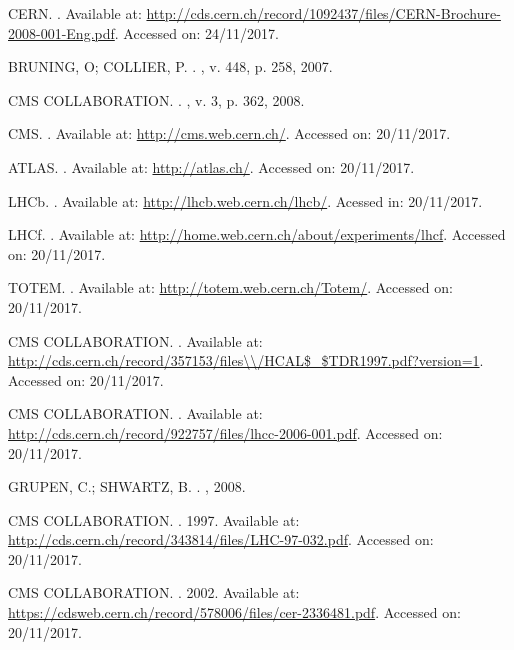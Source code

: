 \begin{thebibliography}{}
CERN. 
.
Available at: \url{http://cds.cern.ch/record/1092437/files/CERN-Brochure-2008-001-Eng.pdf}.
Accessed on: 24/11/2017.

BRUNING, O; COLLIER, P.
.
, v. 448, p. 258, 2007.

CMS COLLABORATION.
.
, v. 3, p. 362, 2008.

CMS.
.
Available at: \url{http://cms.web.cern.ch/}.
Accessed on: 20/11/2017.

ATLAS.
.
Available at: \url{http://atlas.ch/}.
Accessed on: 20/11/2017.

LHCb.
.
Available at: \url{http://lhcb.web.cern.ch/lhcb/}.
Acessed in: 20/11/2017.

LHCf.
.
Available at: \url{http://home.web.cern.ch/about/experiments/lhcf}.
Accessed on: 20/11/2017.

TOTEM.
.
Available at: \url{http://totem.web.cern.ch/Totem/}.
Accessed on: 20/11/2017.

CMS COLLABORATION.
.
Available at: \url{http://cds.cern.ch/record/357153/files\\/HCAL$\_$TDR1997.pdf?version=1}.
Accessed on: 20/11/2017.

CMS COLLABORATION.
.
Available at: \url{http://cds.cern.ch/record/922757/files/lhcc-2006-001.pdf}.
Accessed on: 20/11/2017.

GRUPEN, C.; SHWARTZ, B.
.
, 2008.

CMS COLLABORATION.
. 1997.
Available at: \url{http://cds.cern.ch/record/343814/files/LHC-97-032.pdf}.
Accessed on: 20/11/2017.

CMS COLLABORATION.
. 2002.
Available at: \url{https://cdsweb.cern.ch/record/578006/files/cer-2336481.pdf}.
Accessed on: 20/11/2017.


\end{thebibliography}
